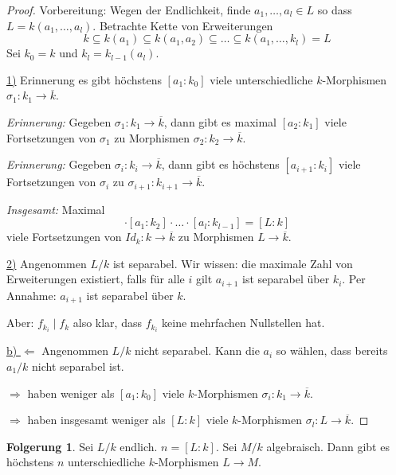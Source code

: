 \documentclass[12pt,parskip=full]{scrartcl}
\newcommand{\heading}{\underline}
\theoremstyle{definition}
\newtheorem{corollary}[theorem]{Folgerung}
\theoremstyle{remark}
\begin{document}
	\begin{proof}
		Vorbereitung: Wegen der Endlichkeit, finde $a_1, \dots, a_l \in L$ so dass $L = k(a_1, \dots, a_l)$. Betrachte Kette von Erweiterungen
		\begin{equation*}
			k \subseteq k(a_1) \subseteq k(a_1, a_2) \subseteq \dots \subseteq k(a_1, \dots, k_l) = L
		\end{equation*}
		Sei $k_0 = k$ und $k_l = k_{l-1}(a_l)$.
		
		\heading{1)} Erinnerung es gibt höchstens $[a_1: k_0]$ viele unterschiedliche $k$-Morphismen $\sigma_1: k_1 \to \overline{k}$.
		
		\textit{Erinnerung:} Gegeben $\sigma_1: k_1 \to \overline{k}$, dann gibt es maximal $[a_2 : k_1]$ viele Fortsetzungen von $\sigma_1$ zu Morphismen $\sigma_2: k_2 \to \overline{k}$.
		
		\textit{Erinnerung:} Gegeben $\sigma_i: k_i \to \overline{k}$, dann gibt es höchstens $[a_{i+1}: k_i]$ viele Fortsetzungen von $\sigma_i$ zu $\sigma_{i+1}: k_{i+1} \to \overline{k}$.
		
		\textit{Insgesamt:} Maximal
		\begin{equation*}
			[a_1: k_0] \cdot [a_1: k_2] \cdot \dots \cdot [a_l: k_{l-1}] = [L:k]
		\end{equation*}
		viele Fortsetzungen von $Id_k: k \to \overline{k}$ zu Morphismen $L \to \overline{k}$.
		
		\heading{2)} Angenommen $L/k$ ist separabel. Wir wissen: die maximale Zahl von Erweiterungen existiert, falls für alle $i$ gilt $a_{i+1}$ ist separabel über $k_i$. Per Annahme: $a_{i+1}$ ist separabel über $k$.
		
		Aber: $f_{k_i} \mid f_k$ also klar, dass $f_{k_i}$ keine mehrfachen Nullstellen hat.
		
		\heading{b) $\Leftarrow$} Angenommen $L/k$ nicht separabel. Kann die $a_i$ so wählen, dass bereits $a_1/k$ nicht separabel ist.
		
		$\Rightarrow$ haben weniger als $[a_1: k_0]$ viele $k$-Morphismen $\sigma_i: k_1 \to \overline{k}$.
		
		$\Rightarrow$ haben insgesamt weniger als $[L:k]$ viele $k$-Morphismen $\sigma_l: L \to \overline{k}$.
	\end{proof}

	\begin{corollary}
		Sei $L/k$ endlich. $n = [L:k]$. Sei $M/k$ algebraisch. Dann gibt es höchstens $n$ unterschiedliche $k$-Morphismen $L \to M$.
	\end{corollary}
\end{document}

